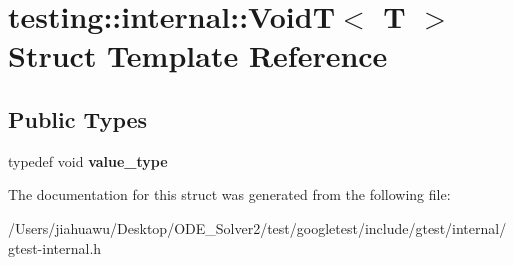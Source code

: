 \hypertarget{structtesting_1_1internal_1_1_void_t}{}\section{testing\+:\+:internal\+:\+:VoidT$<$ T $>$ Struct Template Reference}
\label{structtesting_1_1internal_1_1_void_t}
\subsection*{Public Types}
\begin{DoxyCompactItemize}
\item 
\mbox{\label{structtesting_1_1internal_1_1_void_t_a29e6a3f3989ddb47103944b350f1bec0}} 
typedef void {\bfseries value\+\_\+type}
\end{DoxyCompactItemize}


The documentation for this struct was generated from the following file\+:\begin{DoxyCompactItemize}
\item 
/\+Users/jiahuawu/\+Desktop/\+O\+D\+E\+\_\+\+Solver2/test/googletest/include/gtest/internal/gtest-\/internal.\+h\end{DoxyCompactItemize}

